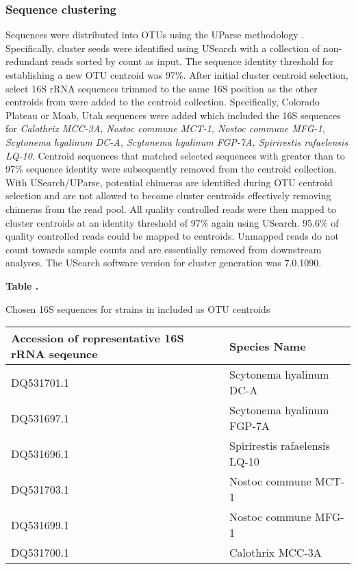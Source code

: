 \subsubsection{Sequence clustering}
Sequences were distributed into OTUs using the UParse methodology
\citep{23955772}. Specifically, cluster seeds were identified using USearch with
a collection of non-redundant reads sorted by count as input. The sequence
identity threshold for establishing a new OTU centroid was 97\%. After initial
cluster centroid selection, select 16S rRNA sequences trimmed to the same 16S
position as the other centroids from \citet{Yeager} were added to the centroid
collection. Specifically, \citet{Yeager} Colorado Plateau or Moab, Utah
sequences were added which included the 16S sequences for \textit{Calothrix
MCC-3A, Nostoc commune MCT-1, Nostoc commune MFG-1, Scytonema hyalinum DC-A,
Scytonema hyalinum FGP-7A, Spirirestis rafaelensis LQ-10}. Centroid sequences
that matched selected \citet{Yeager} sequences with greater than to 97\%
sequence identity were subsequently removed from the centroid collection. With
USearch/UParse, potential chimeras are identified during OTU centroid selection
and are not allowed to become cluster centroids effectively removing chimeras
from the read pool. All quality controlled reads were then mapped to cluster
centroids at an identity threshold of 97\% again using USearch. 95.6\% of
quality controlled reads could be mapped to centroids. Unmapped reads do not
count towards sample counts and are essentially removed from downstream
analyses. The USearch software version for cluster generation was 7.0.1090.

\begin{table}

\textbf{
\label{table:yeager_2006} 
Table .
}

{Chosen 16S sequences for strains in \citet{Yeager} included as
OTU centroids}

{\begin{tabular}{ l l }
\toprule
\textbf{Accession of representative 16S rRNA seqeunce} & \textbf{Species Name} \\ \midrule 
DQ531701.1 & Scytonema hyalinum DC-A \\ \midrule 
DQ531697.1 & Scytonema hyalinum FGP-7A \\ \midrule
DQ531696.1 & Spirirestis rafaelensis LQ-10 \\ \midrule
DQ531703.1 & Nostoc commune MCT-1 \\ \midrule
DQ531699.1 & Nostoc commune MFG-1 \\ DQ531700.1 & Calothrix MCC-3A  \\ 
\bottomrule
\end{tabular}}{} 

\end{table}

